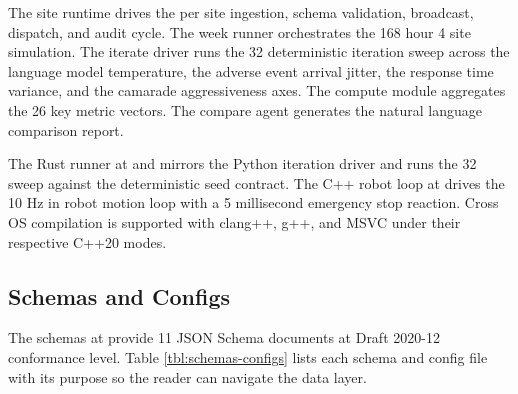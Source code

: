 \begin{sectionaccent}
The site runtime drives the per site ingestion, schema validation,
broadcast, dispatch, and audit cycle. The week runner orchestrates
the 168 hour 4 site simulation. The iterate driver runs the 32
deterministic iteration sweep across the language model temperature,
the adverse event arrival jitter, the response time variance, and
the camarade aggressiveness axes. The compute module aggregates the
26 key metric vectors. The compare agent generates the natural
language comparison report.

The Rust runner at  and  mirrors
the Python iteration driver and runs the 32 sweep against the
deterministic seed contract. The C++ robot loop at
 drives the 10 Hz in robot motion loop with a 5
millisecond emergency stop reaction. Cross OS compilation is
supported with clang++, g++, and MSVC under their respective C++20
modes.

\subsection{Schemas and Configs}
\label{sec:methods-schemas-configs}

The schemas at  provide 11 JSON Schema
documents at Draft 2020-12 conformance level. Table
\ref{tbl:schemas-configs} lists each schema and config file with its
purpose so the reader can navigate the data layer.


\end{sectionaccent}

